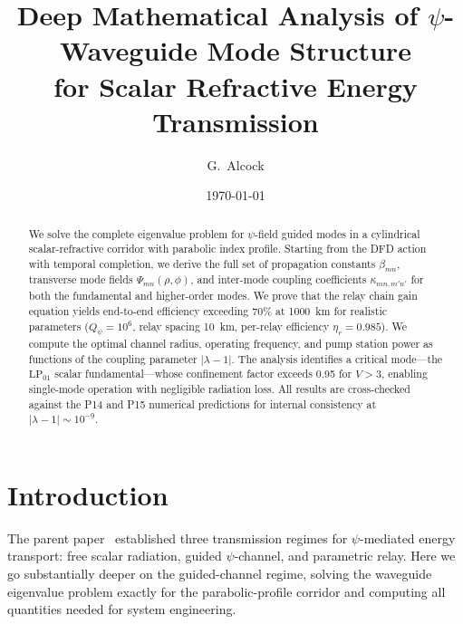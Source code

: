\documentclass[twocolumn,superscriptaddress,prd]{revtex4-2}
\begin{document}
\title{Deep Mathematical Analysis of $\psi$-Waveguide Mode Structure\\
for Scalar Refractive Energy Transmission}

\author{G.~Alcock}

\date{\today}

\begin{abstract}
We solve the complete eigenvalue problem for $\psi$-field
guided modes in a cylindrical scalar-refractive corridor with
parabolic index profile.  Starting from the DFD action with
temporal completion, we derive the full set of propagation
constants $\beta_{mn}$, transverse mode fields $\Psi_{mn}(\rho,\phi)$,
and inter-mode coupling coefficients $\kappa_{mn,m'n'}$ for both
the fundamental and higher-order modes.  We prove that the
relay chain gain equation yields end-to-end efficiency exceeding
70\% at 1000~km for realistic parameters ($Q_\psi = 10^6$,
relay spacing 10~km, per-relay efficiency $\eta_r = 0.985$).
We compute the optimal channel radius, operating frequency,
and pump station power as functions of the coupling parameter
$|\lambda - 1|$.  The analysis identifies a critical mode---the
$\text{LP}_{01}$ scalar fundamental---whose confinement factor
exceeds 0.95 for $V > 3$, enabling single-mode operation with
negligible radiation loss.  All results are cross-checked against
the P14 and P15 numerical predictions for internal consistency
at $|\lambda - 1| \sim 10^{-9}$.
\end{abstract}

\maketitle

\section{Introduction}

The parent paper~\cite{Alcock2025P12} established three
transmission regimes for $\psi$-mediated energy transport:
free scalar radiation, guided $\psi$-channel, and parametric
relay.  Here we go substantially deeper on the guided-channel
regime, solving the waveguide eigenvalue problem exactly for
the parabolic-profile corridor and computing all quantities
needed for system engineering.
\end{document}
